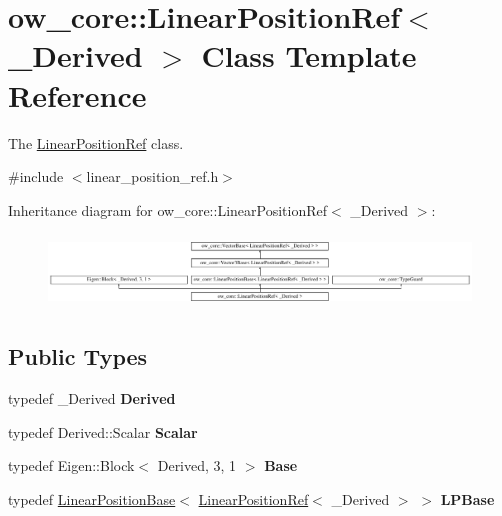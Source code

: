 \hypertarget{classow__core_1_1LinearPositionRef}{}\section{ow\+\_\+core\+:\+:Linear\+Position\+Ref$<$ \+\_\+\+Derived $>$ Class Template Reference}
\label{classow__core_1_1LinearPositionRef}


The \hyperlink{classow__core_1_1LinearPositionRef}{Linear\+Position\+Ref} class.  




{\ttfamily \#include $<$linear\+\_\+position\+\_\+ref.\+h$>$}

Inheritance diagram for ow\+\_\+core\+:\+:Linear\+Position\+Ref$<$ \+\_\+\+Derived $>$\+:\begin{figure}[H]
\begin{center}
\leavevmode
\includegraphics[height=1.954625cm]{da/d4c/classow__core_1_1LinearPositionRef}
\end{center}
\end{figure}
\subsection*{Public Types}
\begin{DoxyCompactItemize}
\item 
typedef \+\_\+\+Derived {\bfseries Derived}\hypertarget{classow__core_1_1LinearPositionRef_a44d84d26f5ce03cb78cb010c148e9553}{}\label{classow__core_1_1LinearPositionRef_a44d84d26f5ce03cb78cb010c148e9553}

\item 
typedef Derived\+::\+Scalar {\bfseries Scalar}\hypertarget{classow__core_1_1LinearPositionRef_a6b274500d3dec0cd998df28220e0da88}{}\label{classow__core_1_1LinearPositionRef_a6b274500d3dec0cd998df28220e0da88}

\item 
typedef Eigen\+::\+Block$<$ Derived, 3, 1 $>$ {\bfseries Base}\hypertarget{classow__core_1_1LinearPositionRef_a24d6f0ea6b6a7896ceb368fd1cffeca1}{}\label{classow__core_1_1LinearPositionRef_a24d6f0ea6b6a7896ceb368fd1cffeca1}

\item 
typedef \hyperlink{classow__core_1_1LinearPositionBase}{Linear\+Position\+Base}$<$ \hyperlink{classow__core_1_1LinearPositionRef}{Linear\+Position\+Ref}$<$ \+\_\+\+Derived $>$ $>$ {\bfseries L\+P\+Base}\hypertarget{classow__core_1_1LinearPositionRef_a6ec1df7c83a9d9fba242a7b14aec7043}{}\label{classow__core_1_1LinearPositionRef_a6ec1df7c83a9d9fba242a7b14aec7043}

\end{DoxyCompactItemize}
